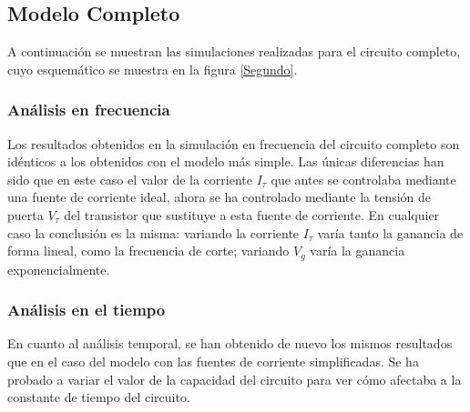 	\subsection{Modelo Completo}

A continuación se muestran las simulaciones realizadas para el circuito completo, cuyo esquemático se muestra en la figura \ref{Segundo}.

\subsubsection{Análisis en frecuencia}

Los resultados obtenidos en la simulación en frecuencia del circuito completo son idénticos a los obtenidos con el modelo más simple. Las únicas diferencias han sido que en este caso el valor de la corriente $I_{\tau}$ que antes se controlaba mediante una fuente de corriente ideal, ahora se ha controlado mediante la tensión de puerta $V_{\tau}$ del transistor que sustituye a esta fuente de corriente. En cualquier caso la conclusión es la misma: variando la corriente $I_{\tau}$ varía tanto la ganancia de forma lineal, como la frecuencia de corte; variando $V_g$ varía la ganancia exponencialmente.

\subsubsection{Análisis en el tiempo}

En cuanto al análisis temporal, se han obtenido de nuevo los mismos resultados que en el caso del modelo con las fuentes de corriente simplificadas. Se ha probado a variar el valor de la capacidad del circuito para ver cómo afectaba a la constante de tiempo del circuito.

